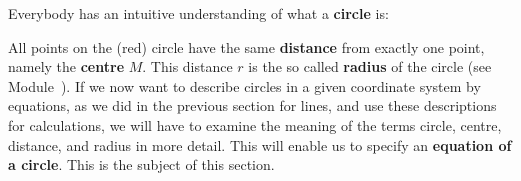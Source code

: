 \begin{MIntro}

Everybody has an intuitive understanding of what a \textbf{circle} is:

\begin{center}
%
\end{center}
All points on the (red) circle have the same \textbf{distance} from exactly one point, namely the 
\textbf{centre} $M$. This distance $r$ is the so called \textbf{radius} of the circle (see Module~).
If we now want to describe circles in a given coordinate system by equations, as we did in the previous section 
for lines, and use these descriptions for calculations, we will have to examine the meaning of the terms circle, centre, 
distance, and radius in more detail. This will enable us to specify an \textbf{equation of a circle}. This is the subject 
of this section. 

\end{MIntro}

